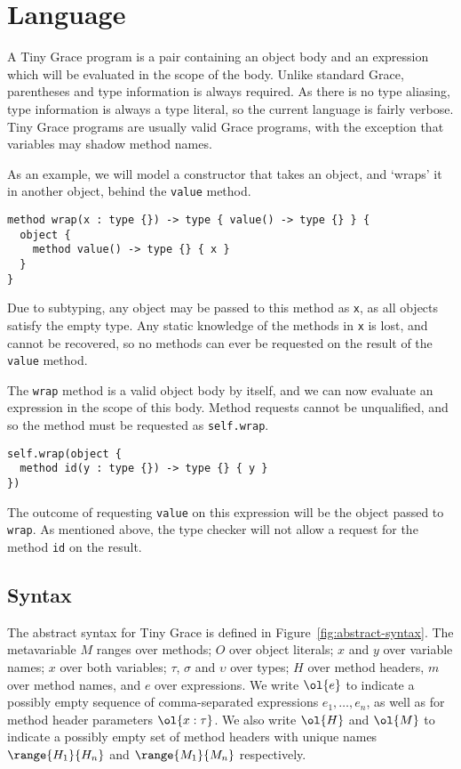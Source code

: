 \section{Language}\label{sec:language}

A Tiny Grace program is a pair containing an object body and an expression which
will be evaluated in the scope of the body. Unlike standard Grace, parentheses
and type information is always required. As there is no type aliasing, type
information is always a type literal, so the current language is fairly verbose.
Tiny Grace programs are usually valid Grace programs, with the exception that
variables may shadow method names.

As an example, we will model a constructor that takes an object, and `wraps' it
in another object, behind the \lstinline{value} method.

\begin{lstlisting}
method wrap(x : type {}) -> type { value() -> type {} } {
  object {
    method value() -> type {} { x }
  }
}
\end{lstlisting}

\noindent Due to subtyping, any object may be passed to this method as
\lstinline{x}, as all objects satisfy the empty type. Any static knowledge of
the methods in \lstinline{x} is lost, and cannot be recovered, so no methods can
ever be requested on the result of the \lstinline{value} method.

The \lstinline{wrap} method is a valid object body by itself, and we can now
evaluate an expression in the scope of this body. Method requests cannot be
unqualified, and so the method must be requested as \lstinline{self.wrap}.

\begin{lstlisting}
self.wrap(object {
  method id(y : type {}) -> type {} { y }
})
\end{lstlisting}

\noindent The outcome of requesting \lstinline{value} on this expression will be
the object passed to \lstinline{wrap}. As mentioned above, the type checker will
not allow a request for the method \lstinline{id} on the result.

\subsection{Syntax}\label{sec:syntax}

The abstract syntax for Tiny Grace is defined in
Figure~\ref{fig:abstract-syntax}. The metavariable $M$ ranges over methods; $O$
over object literals; $x$ and $y$ over variable names; $x$ over both variables;
$\tau$, $\sigma$ and $\upsilon$ over types; $H$ over method headers, $m$ over
method names, and $e$ over expressions. We write $\ol{e}$ to indicate a possibly
empty sequence of comma-separated expressions $e_1,\dots,e_n$, as well as for
method header parameters $\ol{x:\tau}$. We also write $\ol{H}$ and $\ol{M}$ to
indicate a possibly empty set of method headers with unique names
$\range{H_1}{H_n}$ and $\range{M_1}{M_n}$ respectively.


